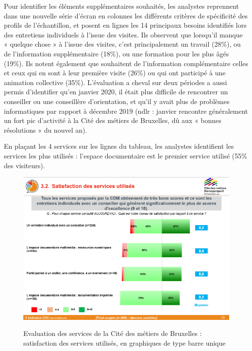\documentclass[french,a4paper,12pt]{article}
\begin{document}
\quad Pour identifier les éléments supplémentaires souhaités, les analystes reprennent dans une nouvelle série d’écran en colonnes les différents critères de spécificité des profils de l’échantillon, et posent en lignes les 14 principaux besoins identifiés lors des entretiens individuels à l’issue des visites. Ils observent que lorsqu’il manque « quelque chose » à l’issue des visites, c’est principalement un travail (28\%), ou de l’information supplémentaire (18\%), ou une formation pour les plus âgés (19\%). Ils notent également que souhaitent de l’information complémentaire celles et ceux qui en sont à leur première visite (26\%) ou qui ont participé à une animation collective (35\%). L’évaluation a cheval sur deux périodes a aussi permis d’identifier qu’en janvier 2020, il était plus difficile de rencontrer un conseiller ou une conseillère d’orientation, et qu’il y avait plus de problèmes informatiques par rapport à décembre 2019 (ndlr : janvier rencontre généralement un fort pic d’activité à la Cité des métiers de Bruxelles, dû aux « bonnes résolutions » du nouvel an).

\quad En plaçant les 4 services sur les lignes du tableau, les analystes identifient les services les plus utilisés : l’espace documentaire est le premier service utilisé (55\% des visiteurs).

\begin{center}
\begin{figure}
\includegraphics[scale=1.5]{9-cdm-satisfaction.PNG}
\end{figure}
\begin{figure}[h]
\caption{Evaluation des services de la Cité des métiers de Bruxelles :  satisfaction des services utilisés, en graphiques de type barre unique}
\end{figure}
\end{center}
\end{document}
